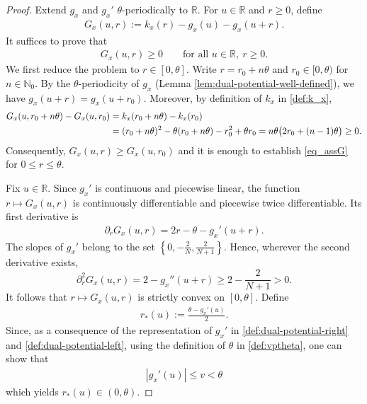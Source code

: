 \documentclass{article}
\begin{document}
\begin{proof}
Extend \(g_x\) and \(g_x'\) \(\theta\)-periodically to \(\mathbb R\).
For \(u\in\mathbb R\) and \(r\geq0\), define
\begin{align}\label{def_Gxar}
    G_x(u,r)
    :=
    k_x(r)-g_x(u)-g_x(u+r).
\end{align} 
It suffices to prove that
\begin{align}\label{eq_assG}
    G_x(u,r)\geq0
    \qquad
    \text{for all }u\in\mathbb R,\ r\geq0.
\end{align}
We first reduce the problem to \(r\in[0,\theta]\).
Write \(r=r_0+n\theta\) and \(r_0\in[0,\theta)\) for \(n\in\mathbb N_0\).
By the \(\theta\)-periodicity of \(g_x\) (Lemma \ref{lem:dual-potential-well-defined}), we have \(g_x(u+r)=g_x(u+r_0)\).
Moreover, by definition of \(k_x\) in \eqref{def:k_x},
\begin{align}\label{eq:G-periodic-increment}
G_x(u,r_0+n\theta)-G_x(u,r_0) 
    & =k_x(r_0+n\theta)-k_x(r_0)\\
    &=
    (r_0+n\theta)^2
    -\theta(r_0+n\theta)
    -r_0^2+\theta r_0
    =
    n\theta
    \bigl(2r_0+(n-1)\theta\bigr)
    \geq0. \notag
\end{align}
Consequently, \(G_x(u,r)\geq G_x(u,r_0)\) and it is enough to establish \eqref{eq_assG} for \(0\leq r\leq\theta\).

Fix \(u\in\mathbb R\).
Since \(g_x'\) is continuous and piecewise linear, the function \(r\longmapsto G_x(u,r)\) is continuously differentiable and piecewise twice differentiable.
Its first derivative is
\begin{align}\label{eq_delGr}
    \partial_rG_x(u,r)
    =
    2r-\theta-g_x'(u+r).
\end{align}
The slopes of \(g_x'\) belong to the set \(\left\{ 0,-\frac{2}{N},\frac{2}{N+1} \right\}\).
Hence, wherever the second derivative exists,
\[
    \partial_r^2G_x(u,r)
    =
    2-g_x''(u+r)
    \geq
    2-\frac{2}{N+1}
    >0.
\]
It follows that \(r\mapsto G_x(u,r)\) is strictly convex on \([0,\theta]\).
Define
\begin{align}\label{eq:def-r-star}
    r_*(u)
    :=
    \frac{\theta-g_x'(u)}{2}.
\end{align}
Since, as a consequence of the representation of \(g_x'\) in \eqref{def:dual-potential-right} and \eqref{def:dual-potential-left}, using the definition of \(\theta\) in \eqref{def:vptheta}, one can show that
\begin{align}\label{ineq_gp}
    |g_x'(u)|\leq v<\theta
\end{align}
which yields
\(
    r_*(u)\in(0,\theta).
\)


\end{proof}
\end{document}
